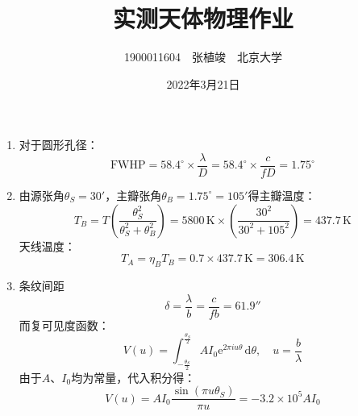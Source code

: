 \documentclass[a4paper]{article}
\begin{document}
\title{\textbf{实测天体物理作业}}
\author{1900011604\ \ 张植竣\ \ 北京大学}
\date{2022年3月21日}
\maketitle

\begin{enumerate}

    \item[1.]
    对于圆形孔径：
    \[
        \mathrm{FWHP} = 58.4^\circ \times \frac{\lambda}{D} = 58.4^\circ \times \frac{c}{fD} = 1.75^\circ
    \]

    \item[2.]
    由源张角$\theta_S = 30'$，主瓣张角$\theta_B = 1.75^\circ = 105'$得主瓣温度：
    \[
        T_B = T\left(\frac{\theta_S^2}{\theta_S^2 + \theta_B^2}\right) = 5800\,\mathrm{K} \times \left(\frac{30^2}{30^2 + 105^2}\right) = 437.7\,\mathrm{K}
    \]
    天线温度：
    \[
        T_A = \eta_B T_B = 0.7 \times 437.7\,\mathrm{K} = 306.4\,\mathrm{K}
    \]

    \item[3.]
    条纹间距
    \[
        \delta = \frac{\lambda}{b} = \frac{c}{fb} = 61.9''
    \]
    而复可见度函数：
    \[
        V(u) = \int_{-\tfrac{\theta_S}{2}}^{\tfrac{\theta_S}{2}} A I_0 \mathrm{e}^{2\pi iu\theta}\,\mathrm{d}\theta,\quad u = \frac{b}{\lambda}
    \]
    由于$A$、$I_0$均为常量，代入积分得：
    \[
        V(u) = AI_0\frac{\sin(\pi u\theta_S)}{\pi u} = -3.2\times10^{5}AI_0
    \]
\end{enumerate}
\end{document}
